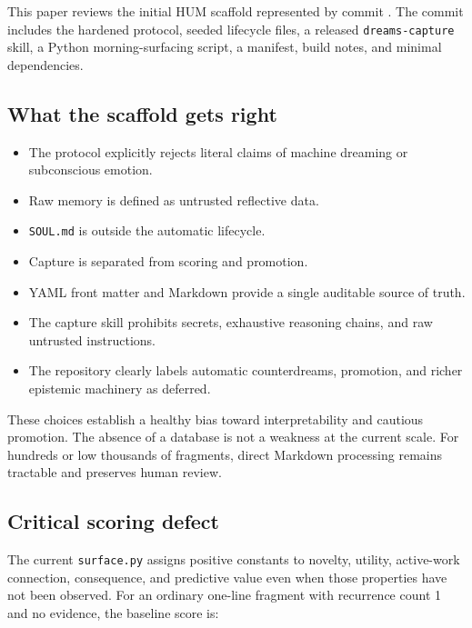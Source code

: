 \documentclass[11pt,a4paper]{article}
\begin{document}
This paper reviews the initial HUM scaffold represented by commit
. The commit includes the hardened protocol, seeded lifecycle files, a released \texttt{dreams-capture} skill, a Python morning-surfacing script, a manifest, build notes, and minimal dependencies.

\subsection{What the scaffold gets right}

\begin{designbox}
\begin{itemize}
  \item The protocol explicitly rejects literal claims of machine dreaming or subconscious emotion.
  \item Raw memory is defined as untrusted reflective data.
  \item \texttt{SOUL.md} is outside the automatic lifecycle.
  \item Capture is separated from scoring and promotion.
  \item YAML front matter and Markdown provide a single auditable source of truth.
  \item The capture skill prohibits secrets, exhaustive reasoning chains, and raw untrusted instructions.
  \item The repository clearly labels automatic counterdreams, promotion, and richer epistemic machinery as deferred.
\end{itemize}
\end{designbox}

These choices establish a healthy bias toward interpretability and cautious promotion. The absence of a database is not a weakness at the current scale. For hundreds or low thousands of fragments, direct Markdown processing remains tractable and preserves human review.

\subsection{Critical scoring defect}

The current \texttt{surface.py} assigns positive constants to novelty, utility, active-work connection, consequence, and predictive value even when those properties have not been observed. For an ordinary one-line fragment with recurrence count 1 and no evidence, the baseline score is:
\end{document}
